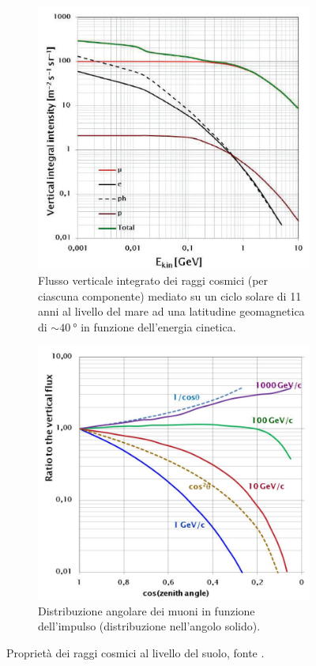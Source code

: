 \begin{figure}
	\begin{subfigure}[t]{0.48\textwidth}
		\centering
		\includegraphics[width=\textwidth]{vertical_flux}
		\caption{\label{fig:vertical_flux}
		Flusso verticale integrato dei raggi cosmici (per ciascuna componente)
		mediato su un ciclo solare di 11 anni al livello del mare
		ad una latitudine geomagnetica di $\sim \SI{40}{\degree}$ in funzione dell'energia cinetica.}
	\end{subfigure}
	\hfill
	\begin{subfigure}[t]{0.48\textwidth}
		\centering
		\includegraphics[width=\textwidth]{angular_distribution}
		\caption{\label{fig:angular_distribution}
		Distribuzione angolare dei muoni in funzione dell'impulso
		(distribuzione nell'angolo solido).}
	\end{subfigure}
	\caption{\label{fig:vertical_angular}
	Proprietà dei raggi cosmici al livello del suolo, fonte \cite{1}.}
\end{figure}

